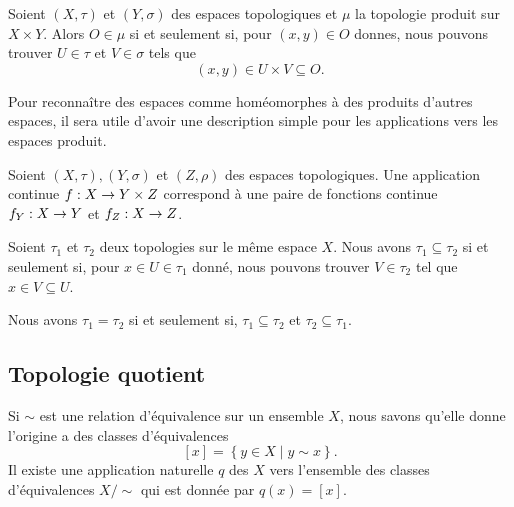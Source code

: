 \documentclass[french]{article}
\begin{document}
\begin{lemme}
  Soient $(X, \tau)$ et $(Y, \sigma)$ des espaces topologiques et $\mu$ la topologie produit sur $X \times Y$. Alors  $O \in \mu$ si et seulement si, pour $(x, y) \in O$ donnes, nous pouvons trouver $U \in \tau$ et $V \in \sigma$ tels que
  $$(x, y) \in U \times V \subseteq O.$$
\end{lemme}
Pour reconnaître des espaces comme homéomorphes à des produits d’autres espaces, il sera utile d’avoir une description simple pour les applications vers les espaces produit.
\begin{propo}
  Soient $(X, \tau), (Y, \sigma)$ et $(Z, \rho)$ des espaces topologiques. Une application continue  $f: X \rightarrow Y \times Z$ correspond à une paire de fonctions continue  $f_Y: X \rightarrow Y$ et  $f_Z: X \rightarrow Z$.

  \tcblower
  \begin{preuve}
  \end{preuve}
\end{propo}

\begin{lemme}
  Soient $\tau_1$ et  $\tau_2$ deux topologies sur le même espace $X$. Nous avons  $\tau_1 \subseteq \tau_2$ si et seulement si, pour $x \in U \in \tau_1$ donné, nous pouvons trouver $V \in \tau_2$ tel que $x \in V \subseteq  U$.
  \par Nous avons $\tau_1 = \tau_2$ si et seulement si, $\tau_1 \subseteq \tau_2$ et $\tau_2\subseteq \tau_1$.
\end{lemme}

\subsection{Topologie quotient}
Si $\sim$ est une relation d'équivalence sur un ensemble $X$, nous savons qu'elle donne l'origine a des classes d'équivalences
$$[x] = \left\{ y \in X \mid y \sim x \right\}.$$
Il existe une application naturelle $q$ des $X$ vers l'ensemble des classes d'équivalences $X/\sim$ qui est donnée par $q(x) = [x]$.
\end{document}
